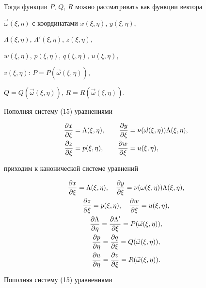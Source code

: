 Тогда функции $P$, $Q$, $R$ можно рассматривать как функции вектора


$\Vec\omega(\xi,\eta)$ с координатами $x(\xi,\eta)$, $y(\xi,\eta)$, 


$\Lambda(\xi,\eta)$, $\Lambda'(\xi,\eta)$, $z(\xi,\eta)$, 


$w(\xi,\eta)$, $p(\xi,\eta)$, $q(\xi,\eta)$, $u(\xi,\eta)$, 


$v(\xi,\eta)$: $P=P(\Vec\omega(\xi,\eta))$, 


$Q=Q(\Vec\omega(\xi,\eta))$, $R=R(\Vec\omega(\xi,\eta))$. 


Пополняя систему (15) уравнениями 


\begin{alignat*}{2} 


\myfrac{x}{\xi}&=\Lambda(\xi,\eta), &\quad 


\myfrac{y}{\xi}&=\nu(\Vec\omega(\xi,\eta))\Lambda(\xi,\eta),\\ 


% 


\myfrac{z}{\xi}&=p(\xi,\eta), &\quad \myfrac{w}{\xi}&=u(\xi,\eta), 


\end{alignat*} 


приходим к канонической системе уравнений 


\begin{gather} 


\myfrac{x}{\xi}=\Lambda(\xi,\eta),\quad 


\myfrac{y}{\xi}=\nu(\omega(\xi,\eta))\Lambda(\xi,\eta),\notag\\ 


% 


\myfrac{z}{\xi}=p(\xi,\eta),\quad \myfrac{w}{\xi}=u(\xi,\eta),\notag\\ 


% 


\myfrac{\Lambda}{\eta}=\myfrac{\Lambda'}{\xi}= 


P(\Vec\omega(\xi,\eta)), \\ 


% 


\myfrac{p}{\eta}=\myfrac{q}{\xi}=Q(\Vec\omega(\xi,\eta)),\notag\\ 


% 


\myfrac{u}{\eta}=\myfrac{v}{\xi}=R(\Vec\omega(\xi,\eta)).\notag 


\end{gather} 


Пополняя систему (15) уравнениями 


